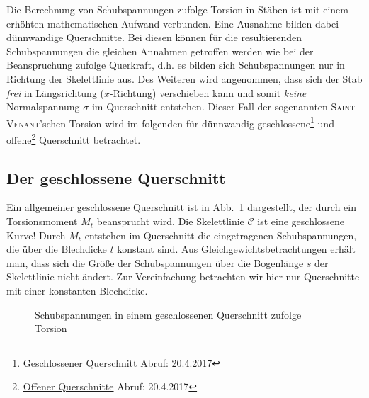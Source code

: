 Die Berechnung von Schubspannungen zufolge Torsion in Stäben ist mit einem erhöhten mathematischen Aufwand verbunden.
Eine Ausnahme bilden dabei dünnwandige Querschnitte. 
Bei diesen können für die resultierenden Schubspannungen die gleichen Annahmen getroffen werden wie bei der Beanspruchung zufolge Querkraft, d.h. es bilden sich Schubspannungen nur in Richtung der Skelettlinie aus.
Des Weiteren wird angenommen, dass sich der Stab \emph{frei} in Längsrichtung ($x$-Richtung) verschieben kann und somit \emph{keine} Normalspannung $\sigma$ im Querschnitt entstehen.
Dieser Fall der sogenannten \textsc{Saint-Venant}'schen Torsion wird im folgenden für dünnwandig geschlossene\footnote{\href{http://www.buschen-stahl.de/stahlrohre.htm}{Geschlossener Querschnitt}\hspace{3mm} Abruf: 20.4.2017} und offene\footnote{\href{http://www.buschen-stahl.de/stahlprofile.htm}{Offener Querschnitte}\hspace{3mm} Abruf: 20.4.2017} Querschnitt betrachtet.  
 
%
\subsection{Der geschlossene Querschnitt}

Ein allgemeiner geschlossene Querschnitt ist in Abb.~\ref{fig:4-6} dargestellt, der durch ein Torsionsmoment $M_t$ beansprucht wird.
Die Skelettlinie $\mathcal{C}$ ist eine geschlossene Kurve!
Durch $M_t$ entstehen im Querschnitt die eingetragenen Schubspannungen, die über die Blechdicke $t$ konstant sind.
Aus Gleichgewichtsbetrachtungen erhält man, dass sich die Größe der Schubspannungen über die Bogenlänge $s$ der Skelettlinie nicht ändert. 
Zur Vereinfachung betrachten wir hier nur Querschnitte mit einer konstanten Blechdicke.
%
\begin{figure}[h!]
	\centering
	
	\caption{Schubspannungen in einem geschlossenen Querschnitt zufolge Torsion}
	\label{fig:4-6}
\end{figure}
%

